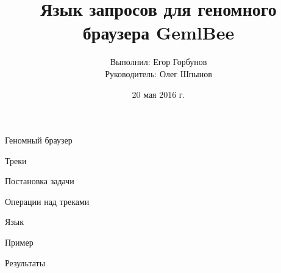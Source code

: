 

\title{Язык запросов для геномного браузера GemlBee}
\author[Егор Горбунов]{
	Выполнил: \hfill Егор Горбунов \\
	Руководитель:  \hfill Олег Шпынов
}
\date{20 мая 2016 г.}


\maketitle

\begin{frame}{Геномный браузер}
\end{frame}

\begin{frame}{Треки}
\end{frame}

\begin{frame}{Постановка задачи}
\end{frame}

\begin{frame}{Операции над треками}
\end{frame}

\begin{frame}{Язык}
\end{frame}

\begin{frame}{Пример}
\end{frame}

\begin{frame}{Результаты}
\end{frame}

